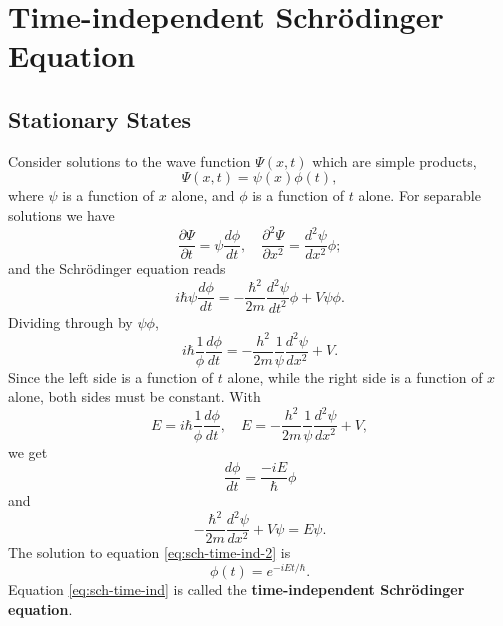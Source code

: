 \documentclass{article}
\begin{document}
\section{Time-independent Schr\"{o}dinger Equation}

\subsection{Stationary States}

Consider solutions to the wave function $\Psi(x, t)$ which are simple products,
\begin{equation} \label{eq:sch-time-ind-1}
  \Psi(x, t) = \psi(x)\phi(t),
\end{equation} where $\psi$ is a function of $x$ alone, and $\phi$ is a
function of $t$ alone. For separable solutions we have \[
  \frac{\partial \Psi}{\partial t} = \psi \frac{d\phi}{dt}, \quad
  \frac{\partial^2 \Psi}{\partial x^2} = \frac{d^2\psi}{dx^2} \phi;
\] and the Schr\"{o}dinger equation reads \[
  i\hbar\psi \frac{d\phi}{dt} = -\frac{\hbar^2}{2m} \frac{d^2\psi}{dt^2} \phi
  + V\psi\phi.
\] Dividing through by $\psi\phi$,
\begin{equation}
  i\hbar \frac{1}{\phi} \frac{d\phi}{dt}
  = -\frac{h^2}{2m} \frac{1}{\psi} \frac{d^2\psi}{dx^2} + V.
\end{equation}
Since the left side is a function of $t$ alone, while the right side is a
function of $x$ alone, both sides must be constant. With \[
  E = i\hbar \frac{1}{\phi} \frac{d\phi}{dt}, \quad
  E = -\frac{h^2}{2m} \frac{1}{\psi} \frac{d^2\psi}{dx^2} + V,
\] we get
\begin{equation} \label{eq:sch-time-ind-2}
  \frac{d\phi}{dt} = \frac{-iE}{\hbar} \phi
\end{equation}
and
\begin{equation} \label{eq:sch-time-ind}
  \boxed{
    -\frac{\hbar^2}{2m} \frac{d^2\psi}{dx^2} + V\psi = E\psi.
  }
\end{equation}
The solution to equation \eqref{eq:sch-time-ind-2} is
\begin{equation} \label{eq:sch-time-ind-psi}
  \phi(t) = e^{-iEt/\hbar}.
\end{equation}
Equation \eqref{eq:sch-time-ind} is called the \textbf{time-independent
Schr\"{o}dinger equation}.
\end{document}
